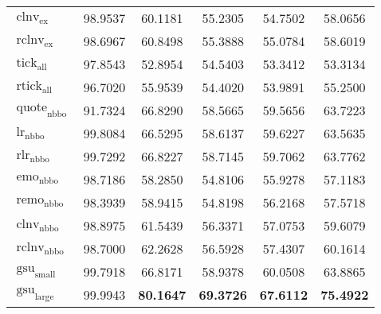 \begin{table}[ht]
\begin{tabular}{@{}lSSSSS@{}}
        $\operatorname{clnv}_{\mathrm{ex}}$    & 98.9537           & 60.1181                            & 55.2305           & 54.7502           & 58.0656           \\
        $\operatorname{rclnv}_{\mathrm{ex}}$   & 98.6967           & 60.8498                            & 55.3888           & 55.0784           & 58.6019           \\ \midrule
        $\operatorname{tick}_{\mathrm{all}}$   & 97.8543           & 52.8954                            & 54.5403           & 53.3412           & 53.3134           \\
        $\operatorname{rtick}_{\mathrm{all}}$  & 96.7020           & 55.9539                            & 54.4020           & 53.9891           & 55.2500           \\ \midrule
        $\operatorname{quote}_{\mathrm{nbbo}}$ & 91.7324           & 66.8290                            & 58.5665           & 59.5656           & 63.7223           \\
        $\operatorname{lr}_{\mathrm{nbbo}}$    & 99.8084           & 66.5295                            & 58.6137           & 59.6227           & 63.5635           \\
        $\operatorname{rlr}_{\mathrm{nbbo}}$   & 99.7292           & 66.8227                            & 58.7145           & 59.7062           & 63.7762           \\
        $\operatorname{emo}_{\mathrm{nbbo}}$   & 98.7186           & 58.2850                            & 54.8106           & 55.9278           & 57.1183           \\
        $\operatorname{remo}_{\mathrm{nbbo}}$  & 98.3939           & 58.9415                            & 54.8198           & 56.2168           & 57.5718           \\
        $\operatorname{clnv}_{\mathrm{nbbo}}$  & 98.8975           & 61.5439                            & 56.3371           & 57.0753           & 59.6079           \\
        $\operatorname{rclnv}_{\mathrm{nbbo}}$ & 98.7000           & 62.2628                            & 56.5928           & 57.4307           & 60.1614           \\ \midrule
        $\operatorname{gsu}_{\mathrm{small}}$  & 99.7918           & 66.8171                            & 58.9378           & 60.0508           & 63.8865           \\
        $\operatorname{gsu}_{\mathrm{large}}$  & 99.9943 & \bfseries 80.1647                  & \bfseries 69.3726 & \bfseries 67.6112 & \bfseries 75.4922 \\
        \bottomrule
    \end{tabular}
\end{table}

